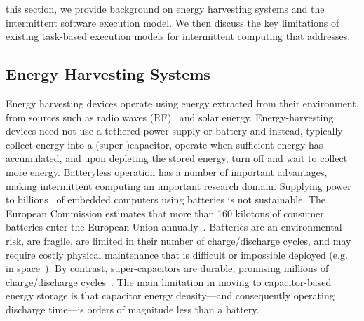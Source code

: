 \In this section, we provide background on energy harvesting systems and the
intermittent software execution model. We then discuss the key limitations of
existing task-based execution models for intermittent computing that \sys
addresses.

\subsection{Energy Harvesting Systems}
\label{sec:background_harvesting}

Energy harvesting devices operate using energy extracted from their
environment, from sources such as radio waves (RF)~\cite{wisp} and solar
energy. Energy-harvesting devices need not use a tethered power supply or
battery and instead, typically collect energy into a (super-)capacitor, operate
when sufficient energy has accumulated, and upon depleting the stored energy,
turn off and wait to collect more energy. 
%
Batteryless operation has a number of important advantages, making intermittent
computing an important research domain. Supplying power to
billions~\cite{gartner_iot} of embedded computers using batteries is not
sustainable. The European Commission estimates that more than 160 kilotons of
consumer batteries enter the European Union annually~\cite{eu_batteries_2016}.
Batteries are an environmental risk, are fragile, are limited in their number
of charge/discharge cycles, and may require costly physical maintenance that is
difficult or impossible deployed (e.g. in space~\cite{kicksat}). By contrast,
super-capacitors are durable, promising millions of charge/discharge
cycles~\cite[Sec. I]{ongaro_pwre_2012}. The main limitation in moving to
capacitor-based energy storage is that capacitor energy density---and
consequently operating discharge time---is orders of magnitude less than a
battery. 


